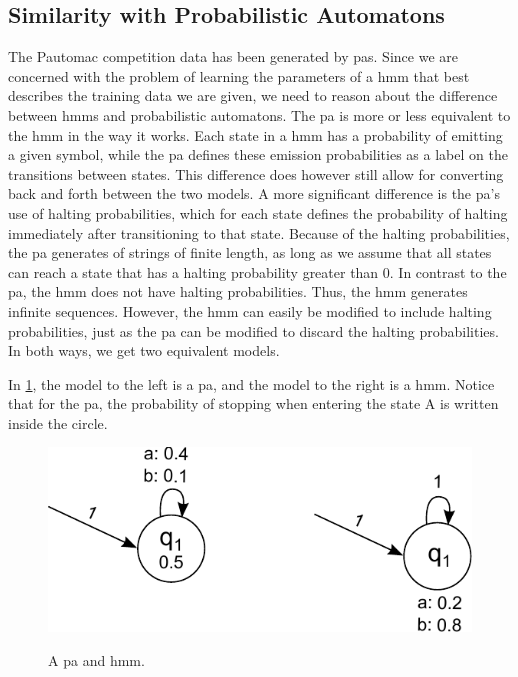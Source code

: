 \subsection{Similarity with Probabilistic Automatons}
The Pautomac competition data has been generated by \gls{pa}s. Since we are concerned with the problem of learning the parameters of a \gls{hmm} that best describes the training data we are given, we need to reason about the difference between \gls{hmm}s and probabilistic automatons. The \gls{pa} is more or less equivalent to the \gls{hmm} in the way it works. Each state in a \gls{hmm} has a probability of emitting a given symbol, while the \gls{pa} defines these emission probabilities as a label on the transitions between states\cite{pautomacTR}. This difference does however still allow for converting back and forth between the two models.
A more significant difference is the \gls{pa}'s use of halting probabilities, which for each state defines the probability of halting immediately after transitioning to that state. Because of the halting probabilities, the \gls{pa} generates of strings of finite length, as long as we assume that all states can reach a state that has a halting probability greater than 0. In contrast to the \gls{pa}, the \gls{hmm} does not have halting probabilities. Thus, the \gls{hmm} generates infinite sequences. However, the \gls{hmm} can easily be modified to include halting probabilities, just as the \gls{pa} can be modified to discard the halting probabilities. In both ways, we get two equivalent models.

In \ref{fig:model-with-and-without-stop-symbols}, the model to the left is a \gls{pa}, and the model to the right is a \gls{hmm}.
Notice that for the \gls{pa}, the probability of stopping when entering the state A is written inside the circle.

\begin{figure}
\begin{centering}
\includegraphics[scale=1]{./pictures/model-with-and-without-stop-symbols.pdf}
\label{fig:model-with-and-without-stop-symbols}
\caption{A \gls{pa} and \gls{hmm}.}
\end{centering}
\end{figure}


